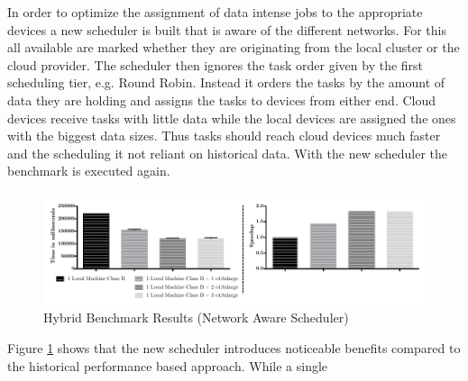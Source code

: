 In order to optimize the assignment of data intense jobs to the appropriate devices a new scheduler is built that is aware of the different networks. For this all available are marked whether they are originating from the local cluster or the cloud provider. The scheduler then ignores the task order given by the first scheduling tier, e.g. Round Robin. Instead it orders the tasks by the amount of data they are holding and assigns the tasks to devices from either end. Cloud devices receive tasks with little data while the local devices are assigned the ones with the biggest data sizes. Thus tasks should reach cloud devices much faster and the scheduling it not reliant on historical data. With the new scheduler the benchmark is executed again.

\begin{figure}[H]	
	\includegraphics[width=1.0\textwidth]{images/hybrid_full_benchmark_network_based.pdf}
	\centering
	\caption{Hybrid Benchmark Results (Network Aware Scheduler)}
	\label{img:hybrid_benchmark_results_network_aware}
\end{figure}

Figure \ref{img:hybrid_benchmark_results_network_aware} shows that the new scheduler introduces noticeable benefits compared to the historical performance based approach. While a single 